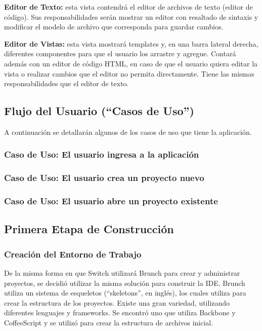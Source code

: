 \documentclass[12pt,titlepage,]{article}
\begin{document}
\textbf{Editor de Texto:} esta vista contendrá el editor de archivos de
texto (editor de código). Sus responsabilidades serán mostrar un editor
con resaltado de sintaxis y modificar el modelo de archivo que
corresponda para guardar cambios.

\textbf{Editor de Vistas:} esta vista mostrará templates y, en una barra
lateral derecha, diferentes componentes para que el usuario los arrastre
y agregue. Contará además con un editor de código HTML, en caso de que
el usuario quiera editar la vista o realizar cambios que el editor no
permita directamente. Tiene las mismas responsabilidades que el editor
de texto.

\subsection{Flujo del Usuario (``Casos de Uso'')}

A continuación se detallarán algunos de los casos de uso que tiene la
aplicación.

\subsubsection{Caso de Uso: El usuario ingresa a la aplicación}

\subsubsection{Caso de Uso: El usuario crea un proyecto nuevo}

\subsubsection{Caso de Uso: El usuario abre un proyecto existente}

\subsection{Primera Etapa de Construcción}

\subsubsection{Creación del Entorno de Trabajo}

De la misma forma en que Switch utilizará Brunch para crear y
administrar proyectos, se decidió utilizar la misma solución para
construir la IDE. Brunch utiliza un sistema de esqueletos
(``skeletons'', en inglés), los cuales utiliza para crear la estructura
de los proyectos. Existe una gran variedad, utilizando diferentes
lenguajes y frameworks. Se encontró uno que utiliza Backbone y
CoffeeScript y se utilizó para crear la estructura de archivos inicial.
\end{document}
